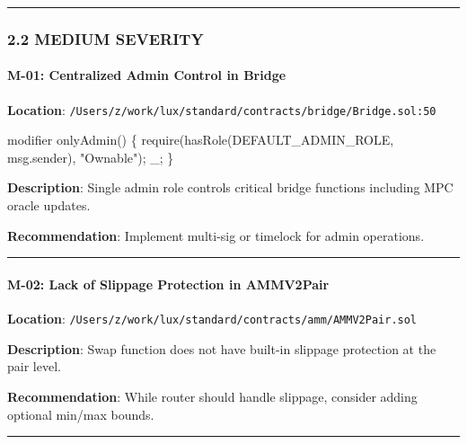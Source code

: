 \documentclass[
]{article}
\newenvironment{Shaded}{}{}
\newcommand{\NormalTok}[1]{#1}
\begin{document}
\begin{center}\rule{0.5\linewidth}{0.5pt}\end{center}

\subsubsection{2.2 MEDIUM SEVERITY}\label{22-medium-severity}

\paragraph{M-01: Centralized Admin Control in
Bridge}\label{m-01-centralized-admin-control-in-bridge}

\textbf{Location}:
\texttt{/Users/z/work/lux/standard/contracts/bridge/Bridge.sol:50}

\begin{Shaded}
\begin{Highlighting}[]
\NormalTok{modifier onlyAdmin() \{}
\NormalTok{    require(hasRole(DEFAULT\_ADMIN\_ROLE, msg.sender), "Ownable");}
\NormalTok{    \_;}
\NormalTok{\}}
\end{Highlighting}
\end{Shaded}

\textbf{Description}: Single admin role controls critical bridge
functions including MPC oracle updates.

\textbf{Recommendation}: Implement multi-sig or timelock for admin
operations.

\begin{center}\rule{0.5\linewidth}{0.5pt}\end{center}

\paragraph{M-02: Lack of Slippage Protection in
AMMV2Pair}\label{m-02-lack-of-slippage-protection-in-ammv2pair}

\textbf{Location}:
\texttt{/Users/z/work/lux/standard/contracts/amm/AMMV2Pair.sol}

\textbf{Description}: Swap function does not have built-in slippage
protection at the pair level.

\textbf{Recommendation}: While router should handle slippage, consider
adding optional min/max bounds.

\begin{center}\rule{0.5\linewidth}{0.5pt}\end{center}
\end{document}
